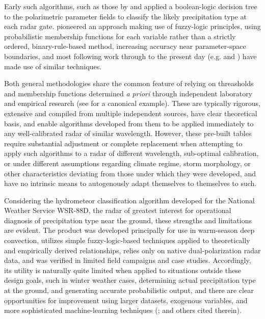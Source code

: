 \documentclass{agujournal}
\begin{document}
Early such algorithms, such as those by \textcite{Straka1993} and \textcite{Hoeller1994} applied a boolean-logic decision tree to the polarimetric parameter fields to classify the likely precipitation type at each radar gate. \textcite{Vivekanandan1999} pioneered an approach making use of fuzzy-logic principles, using probabilistic membership functions for each variable rather than a strictly ordered, binary-rule-based method, increasing accuracy near parameter-space boundaries, and most following work through to the present day (e.g. \cite{Dolan2013} and \textcite{Park2009}) have made use of similar techniques.

Both general methodologies share the common feature of relying on threasholds and membership functions determined \textit{a priori} through independent laboratory and empirical research (see \cite{Straka2000} for a canonical example). These are typically rigorous, extensive and compiled from multiple independent sources, have clear theoretical basis, and enable algorithms developed from them to be applied immediately to any well-calibrated radar of similar wavelength. However, these pre-built tables require substantial adjustment or complete replacement when attempting to apply such algorithms to a radar of different wavelength, sub-optimal calibration, or under different assumptions regarding climate regime, storm morphology, or other characteristics deviating from those under which they were developed, and have no intrinsic means to autogenously adapt themselves to themselves to such.

Considering the hydrometeor classification algorithm \parencite{Park2009} developed for the National Weather Service WSR-88D, the radar of greatest interest for operational diagnosis of precipitation type near the ground, these strengths and limitations are evident. The product was developed principally for use in warm-season deep convection, utilizes simple fuzzy-logic-based techniques applied to theoretically and empirically derived relationships, relies only on native dual-polarization radar data, and was verified in limited field campaigns and case studies. Accordingly, its utility is naturally quite limited when applied to situations outside these design goals, such in winter weather cases, determining actual precipitation type at the ground, and generating accurate probabilistic output, and there are clear opportunities for improvement using larger datasets, exogenous variables, and more sophisticated machine-learning techniques (\cite{Elmore2011}; and others cited therein).
\end{document}
